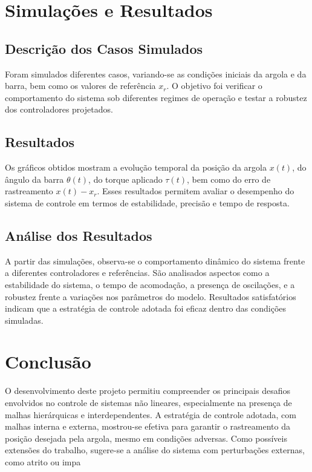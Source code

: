 \documentclass[a4paper, 12pt]{article}
\begin{document}
\section{Simulações e Resultados}

\subsection{Descrição dos Casos Simulados}
Foram simulados diferentes casos, variando-se as condições iniciais da argola e da barra, bem como os valores de referência \( x_r \). O objetivo foi verificar o comportamento do sistema sob diferentes regimes de operação e testar a robustez dos controladores projetados.

\subsection{Resultados}
Os gráficos obtidos mostram a evolução temporal da posição da argola \( x(t) \), do ângulo da barra \( \theta(t) \), do torque aplicado \( \tau(t) \), bem como do erro de rastreamento \( x(t) - x_r \). Esses resultados permitem avaliar o desempenho do sistema de controle em termos de estabilidade, precisão e tempo de resposta.

\subsection{Análise dos Resultados}
A partir das simulações, observa-se o comportamento dinâmico do sistema frente a diferentes controladores e referências. São analisados aspectos como a estabilidade do sistema, o tempo de acomodação, a presença de oscilações, e a robustez frente a variações nos parâmetros do modelo. Resultados satisfatórios indicam que a estratégia de controle adotada foi eficaz dentro das condições simuladas.

\section{Conclusão}
O desenvolvimento deste projeto permitiu compreender os principais desafios envolvidos no controle de sistemas não lineares, especialmente na presença de malhas hierárquicas e interdependentes. A estratégia de controle adotada, com malhas interna e externa, mostrou-se efetiva para garantir o rastreamento da posição desejada pela argola, mesmo em condições adversas. Como possíveis extensões do trabalho, sugere-se a análise do sistema com perturbações externas, como atrito ou impa
\end{document}
